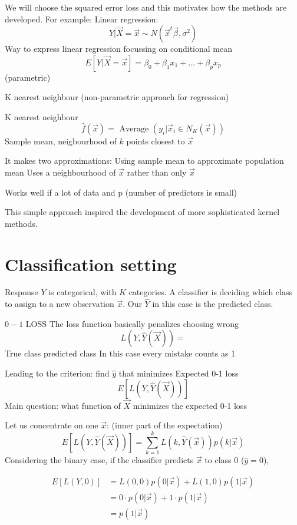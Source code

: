    We will choose the squared error loss and this motivates how the methods are developed.
    For example:
    Linear regression: $$Y|\vec{X} = \vec{x} \sim N(\vec{x}^t\vec{\beta}, \sigma^2)$$
    Way to express linear regression focussing on conditional mean
    $$E[Y|\vec{X} = \vec{x}] = \beta_0 + \beta_1x_1 + \dots + \beta_px_p$$ (parametric)

    K nearest neighbour (non-parametric approach for regression)

    K nearest neighbour 
    $$\hat{f}(\vec{x}) = \text{ Average } (y_i | \vec{x}_i \in N_K(\vec{x}))$$
    Sample mean, neigbourhood of $k$ points closest to $\vec{x}$

    It makes two approximations:
    Using sample mean to approximate population mean
    Uses a neighbourhood of $\vec{x}$ rather than only $\vec{x}$

    Works well if a lot of data and p (number of predictors is small)

    This simple approach inspired the development of more sophisticated kernel methods.

  \section{Classification setting}
    Response $Y$ is categorical, with $K$ categories. 
    A classifier is deciding which class to assign to a new observation $\vec{x}$.
    Our $\hat{Y}$ in this case is the predicted class.

    $0-1$ LOSS The loss function basically penalizes choosing wrong
    $$ L(Y, \hat{Y}(\vec{X})) =$$
    True class predicted class
    In this case every mistake counts as 1

    Leading to the criterion: find $\hat{y}$ that minimizes
    Expected 0-1 loss 
    $$ E[L(Y, \hat{Y}(\vec{X}))]$$
    Main question: what function of $\vec{X}$ minimizes the expected 0-1 loss

    Let us concentrate on one $\vec{x}$: (inner part of the expectation)
    $$E[L(Y, \hat{Y}(\vec{X}))] = \sum_{k=1}^k L(k, \hat{Y}(\vec{x}))p(k|\vec{x})$$
    Considering the binary case, if the classifier predicts $\vec{x}$ to class 0 ($\hat{y} = 0$),

    \begin{align*}
      E[L(Y,0)] & = L(0,0)p(0|\vec{x}) + L(1, 0)p(1|\vec{x}) \\
                & = 0 \cdot p(0|\vec{x}) + 1 \cdot p(1|\vec{x}) \\
                & = p(1|\vec{x})
    \end{align*}

